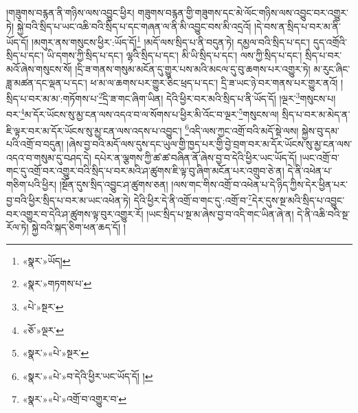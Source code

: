 །གཟུགས་བརྙན་ནི་གཉིས་ལས་འབྱུང་ཕྱིར། གཟུགས་བརྙན་གྱི་གཟུགས་དང་མེ་ལོང་གཉིས་ལས་འབྱུང་བར་འགྱུར་ཏེ། སྐྱེ་བའི་སྲིད་པ་ཡང་འཆི་བའི་སྲིད་པ་དང་གཞན་ལ་ནི་མི་འབྱུང་བས་མི་འདྲའོ། །དེ་བས་ན་སྲིད་པ་བར་མ་ནི་ཡོད་དོ། །མགུར་ནས་གསུངས་ཕྱིར་:ཡོད་དོ།\footnote{«སྣར་»ཡོད།} །མདོ་ལས་སྲིད་པ་ནི་བདུན་ཏེ། དམྱལ་བའི་སྲིད་པ་དང་། དུད་འགྲོའི་སྲིད་པ་དང་། ཡི་དགས་ཀྱི་སྲིད་པ་དང་། ལྷའི་སྲིད་པ་དང་། མི་ཡི་སྲིད་པ་དང་། ལས་ཀྱི་སྲིད་པ་དང་། སྲིད་པ་བར་མའོ་ཞེས་གསུངས་སོ། །དྲི་ཟ་གནས་གསུམ་མངོན་དུ་གྱུར་པས་མའི་མངལ་དུ་བུ་ཆགས་པར་འགྱུར་ཏེ། མ་རུང་ཞིང་ཟླ་མཚན་དང་ལྡན་པ་དང་། ཕ་མ་ལ་ཆགས་པར་གྱུར་ཅིང་ཕྲད་པ་དང་། དྲི་ཟ་ཡང་ཉེ་བར་གནས་པར་གྱུར་ནའོ། །སྲིད་པ་བར་མ་མ་:གཏོགས་པ་\footnote{«སྣར་»གཏགས་པ་}དྲི་ཟ་གང་ཞིག་ཡིན། དེའི་ཕྱིར་བར་མའི་སྲིད་པ་ནི་ཡོད་དོ། །ལྔར་\footnote{«པེ་»སྔར་}གསུངས་པ། བར་\footnote{«ཅོ་»ལྔར་}མ་དོར་ཡོངས་སུ་མྱ་ངན་ལས་འདའ་བ་ལ་སོགས་པ་ཕྱིར་མི་འོང་བ་ལྔར་\footnote{«སྣར་»«པེ་»སྔར་}གསུངས་ལ། སྲིད་པ་བར་མ་མེད་ན་ཇི་ལྟར་བར་མ་དོར་ཡོངས་སུ་མྱ་ངན་ལས་འདས་པ་འབྱུང་། \footnote{«སྣར་»«པེ་»བ་དེའི་ཕྱིར་ཡང་ཡོད་དོ། ། }འདི་ལས་ཀྱང་འགྲོ་བའི་མདོ་སྡེ་ལས། སྐྱེས་བུ་དམ་པའི་འགྲོ་བ་བདུན། །ཞེས་བྱ་བའི་མདོ་ལས་དུས་དང་ཡུལ་གྱི་ཁྱད་པར་གྱི་བྱེ་བྲག་བར་མ་དོར་ཡོངས་སུ་མྱ་ངན་ལས་འདའ་བ་གསུམ་དུ་བཤད་དེ། དཔེར་ན་ལྕགས་ཀྱི་ཚ་ཚ་བཞིན་ནོ་ཞེས་བྱ་བ་དེའི་ཕྱིར་ཡང་ཡོད་དོ། །ཡང་འགྲོ་བ་གང་དུ་འགྲོ་བར་འགྱུར་བའི་སྲིད་པ་བར་མའི་ཤ་ཚུགས་ཇི་ལྟ་བུ་ཞིག་མངོན་པར་འགྲུབ་ཅེ་ན། དེ་ནི་འཕེན་པ་གཅིག་པའི་ཕྱིར། །སྔོན་དུས་སྲིད་འབྱུང་ཤ་ཚུགས་ཅན། །ལས་གང་གིས་འགྲོ་བ་འཕེན་པ་དེ་ཉིད་ཀྱིས་དེར་ཕྱིན་པར་བྱ་བའི་ཕྱིར་སྲིད་པ་བར་མ་ཡང་འཕེན་ཏེ། དེའི་ཕྱིར་དེ་ནི་འགྲོ་བ་གང་དུ་:འགྲོ་བ་\footnote{«སྣར་»«པེ་»འགྲོ་བ་འགྱུར་བ་}དེར་དུས་སྔ་མའི་སྲིད་པ་འབྱུང་བར་འགྱུར་བ་དེའི་ཤ་ཚུགས་ལྟ་བུར་འགྱུར་རོ། །ཡང་སྲིད་པ་སྔ་མ་ཞེས་བྱ་བ་འདི་གང་ཡིན་ཞེ་ན། དེ་ནི་འཆི་བའི་སྔ་རོལ་ཏེ། སྐྱེ་བའི་སྐད་ཅིག་ཕན་ཆད་དོ། །
